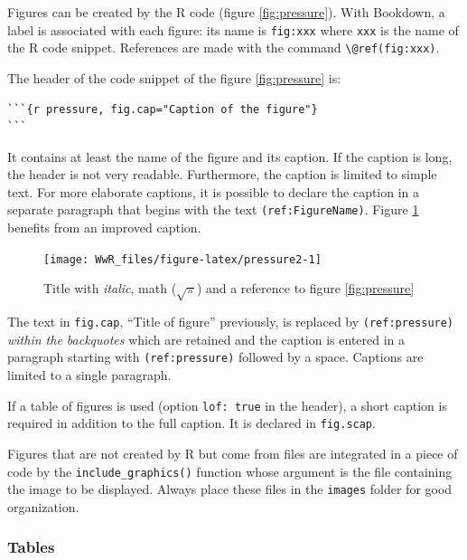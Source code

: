 \documentclass[
  12pt,
  american,
  a4paper,
  extrafontsizes,onecolumn,openright
  ]{memoir}
\begin{document}
\normalsize

Figures can be created by the R code (figure \ref{fig:pressure}).
With Bookdown, a label is associated with each figure: its name is \texttt{fig:xxx} where \texttt{xxx} is the name of the R code snippet.
References are made with the command \texttt{\textbackslash{}@ref(fig:xxx)}.

The header of the code snippet of the figure \ref{fig:pressure} is:

\begin{verbatim}
```{r pressure, fig.cap="Caption of the figure"}
```
\end{verbatim}

It contains at least the name of the figure and its caption.
If the caption is long, the header is not very readable.
Furthermore, the caption is limited to simple text.
For more elaborate captions, it is possible to declare the caption in a separate paragraph that begins with the text \texttt{(ref:FigureName)}.
Figure \ref{fig:pressure2} benefits from an improved caption.



\scriptsize

\begin{figure}

{\centering \texttt{[image: WwR\_files/figure-latex/pressure2-1]} 

}

\caption{Title with \emph{italic}, math (\(\sqrt\pi\)) and a reference to figure \ref{fig:pressure}}\label{fig:pressure2}
\end{figure}

\normalsize

The text in \texttt{fig.cap}, \enquote{Title of figure} previously, is replaced by \texttt{(ref:pressure)} \emph{within the backquotes} which are retained and the caption is entered in a paragraph starting with \texttt{(ref:pressure)} followed by a space.
Captions are limited to a single paragraph.

If a table of figures is used (option \texttt{lof:\ true} in the header), a short caption is required in addition to the full caption.
It is declared in \texttt{fig.scap}.

Figures that are not created by R but come from files are integrated in a piece of code by the \texttt{include\_graphics()} function whose argument is the file containing the image to be displayed.
Always place these files in the \texttt{images} folder for good organization.

\hypertarget{tables}{%
\subsubsection{Tables}\label{tables}}
\end{document}
